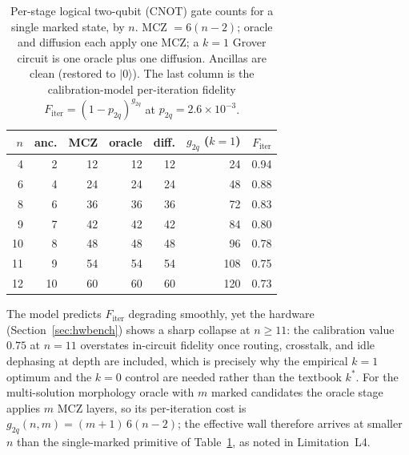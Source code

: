 \documentclass[journal]{IEEEtran}
\providecommand{\ket}[1]{\ensuremath{|#1\rangle}}
\begin{document}
\begin{table}[t]
\centering
\caption{Per-stage logical two-qubit (CNOT) gate counts for a single marked
state, by $n$. MCZ $=6(n{-}2)$; oracle and diffusion each apply one MCZ; a $k{=}1$
Grover circuit is one oracle plus one diffusion. Ancillas are clean (restored to
$\ket{0}$). The last column is the calibration-model per-iteration fidelity
$F_{\mathrm{iter}}=(1{-}p_{2q})^{g_{2q}}$ at $p_{2q}=2.6\times10^{-3}$.}
\label{tab:gatecost}
\small
\begin{tabular}{@{}rrrrrrr@{}}
\toprule
$n$ & anc. & MCZ & oracle & diff. & $g_{2q}$ ($k{=}1$) & $F_{\mathrm{iter}}$ \\
\midrule
4  & 2  & 12 & 12 & 12 & 24  & 0.94 \\
6  & 4  & 24 & 24 & 24 & 48  & 0.88 \\
8  & 6  & 36 & 36 & 36 & 72  & 0.83 \\
9  & 7  & 42 & 42 & 42 & 84  & 0.80 \\
10 & 8  & 48 & 48 & 48 & 96  & 0.78 \\
11 & 9  & 54 & 54 & 54 & 108 & 0.75 \\
12 & 10 & 60 & 60 & 60 & 120 & 0.73 \\
\bottomrule
\end{tabular}
\end{table}

The model predicts $F_{\mathrm{iter}}$ degrading smoothly, yet the hardware
(Section~\ref{sec:hwbench}) shows a sharp collapse at $n\!\ge\!11$: the calibration
value $0.75$ at $n{=}11$ overstates in-circuit fidelity once routing, crosstalk,
and idle dephasing at depth are included, which is precisely why the empirical
$k{=}1$ optimum and the $k{=}0$ control are needed rather than the textbook
$k^{*}$. For the multi-solution morphology oracle with $m$ marked candidates the
oracle stage applies $m$ MCZ layers, so its per-iteration cost is
$g_{2q}(n,m)=(m{+}1)\,6(n{-}2)$; the effective wall therefore arrives at smaller
$n$ than the single-marked primitive of Table~\ref{tab:gatecost}, as noted in
Limitation~L4.
\end{document}
